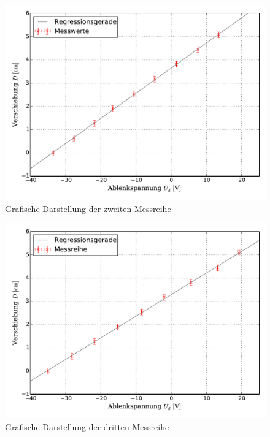 		\begin{figure}[!h]
				\includegraphics[scale=0.7]{Grafiken/EFeld_Messreihe_II.pdf}
				\caption{Grafische Darstellung der zweiten Messreihe}\label{fig:Auswertung_Messdaten_I_II}
		\end{figure}
		
		\begin{figure}[!h]
				\includegraphics[scale=0.7]{Grafiken/EFeld_Messreihe_III.pdf}
				\caption{Grafische Darstellung der dritten Messreihe}\label{fig:Auswertung_Messdaten_I_III}
		\end{figure}
		
